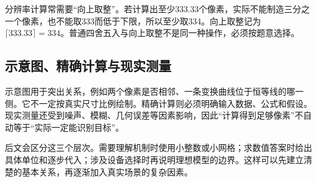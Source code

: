 分辨率计算常需要“向上取整”。若计算出至少333.33个像素，实际不能制造三分之一个像素，也不能取333而低于下限，所以至少取334。向上取整记为$\lceil333.33\rceil=334$。普通四舍五入与向上取整不是同一种操作，必须按题意选择。

\subsection{示意图、精确计算与现实测量}
示意图用于突出关系，例如两个像素是否相邻、一条变换曲线位于恒等线的哪一侧。它不一定按真实尺寸比例绘制。精确计算则必须明确输入数据、公式和假设。现实测量还受到噪声、模糊、几何误差等因素影响，因此“计算得到足够像素”不自动等于“实际一定能识别目标”。

后文会区分这三个层次。需要理解机制时使用小整数或小网格；求数值答案时给出具体单位和逐步代入；涉及设备选择时再说明理想模型的边界。这样可以先建立清楚的基本关系，再逐渐加入真实场景的复杂因素。
